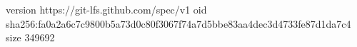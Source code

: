 version https://git-lfs.github.com/spec/v1
oid sha256:fa0a2a6c7c9800b5a73d0c80f3067f74a7d5bbe83aa4dec3d4733fe87d1da7c4
size 349692
